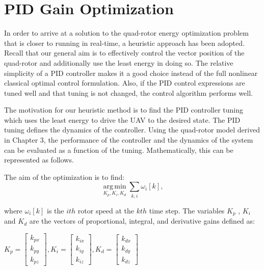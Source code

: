 
\chapter{PID Gain Optimization} %

\label{Chapter7} %



In order to arrive at a solution to the quad-rotor energy optimization problem that is closer to running in real-time, a heuristic approach has been adopted. Recall that our general aim is to effectively control the vector position of the quad-rotor and additionally use the least energy in doing so. The relative simplicity of a PID controller makes it a good choice instead of the full nonlinear classical optimal control formulation. Also, if the PID control expressions are tuned well and that tuning is not changed, the control algorithm performs well.

The motivation for our heuristic method is to find the PID controller tuning which uses the least energy to drive the UAV to the desired state. The PID tuning defines the dynamics of the controller. Using the quad-rotor model derived in Chapter 3, the performance of the controller and the dynamics of the system can be evaluated as a function of the tuning. Mathematically, this can be represented as follows.


The aim of the optimization is to find:
\begin{equation}
  \operatorname*{arg\,min}_{K_p , K_i , K_d}          \sum_{k,i} \omega_i[k]    ,
\end{equation}

 where $\omega_i[k]$ is the $ith$ rotor speed at the $kth$ time step. The variables $K_p$ , $K_i$ and $K_d$ are the vectors of proportional, integral, and derivative gains defined as:

\begin{center}
$ K_p = \left[ \begin{array}{c} k_{px} \\ k_{py} \\ k_{pz}  \end{array} \right] , K_i = \left[ \begin{array}{c} k_{ix} \\ k_{iy} \\ k_{iz}  \end{array} \right], K_d = \left[ \begin{array}{c} k_{dx} \\ k_{dy} \\ k_{dz}  \end{array} \right] $
\end{center}

